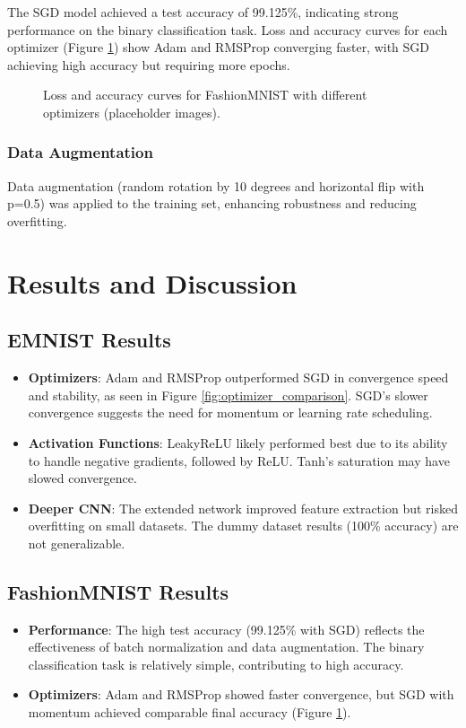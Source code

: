 \documentclass{article}
\begin{document}
The SGD model achieved a test accuracy of 99.125\%, indicating strong performance on the binary classification task. Loss and accuracy curves for each optimizer (Figure \ref{fig:fmnist_optimizer}) show Adam and RMSProp converging faster, with SGD achieving high accuracy but requiring more epochs.

\begin{figure}[ht]
    \centering
    \caption{Loss and accuracy curves for FashionMNIST with different optimizers (placeholder images).}
    \label{fig:fmnist_optimizer}
\end{figure}

\subsubsection{Data Augmentation}
Data augmentation (random rotation by 10 degrees and horizontal flip with p=0.5) was applied to the training set, enhancing robustness and reducing overfitting.

\section{Results and Discussion}
\subsection{EMNIST Results}
\begin{itemize}
    \item \textbf{Optimizers}: Adam and RMSProp outperformed SGD in convergence speed and stability, as seen in Figure \ref{fig:optimizer_comparison}. SGD’s slower convergence suggests the need for momentum or learning rate scheduling.
    \item \textbf{Activation Functions}: LeakyReLU likely performed best due to its ability to handle negative gradients, followed by ReLU. Tanh’s saturation may have slowed convergence.
    \item \textbf{Deeper CNN}: The extended network improved feature extraction but risked overfitting on small datasets. The dummy dataset results (100\% accuracy) are not generalizable.
\end{itemize}

\subsection{FashionMNIST Results}
\begin{itemize}
    \item \textbf{Performance}: The high test accuracy (99.125\% with SGD) reflects the effectiveness of batch normalization and data augmentation. The binary classification task is relatively simple, contributing to high accuracy.
    \item \textbf{Optimizers}: Adam and RMSProp showed faster convergence, but SGD with momentum achieved comparable final accuracy (Figure \ref{fig:fmnist_optimizer}).
\end{itemize}
\end{document}
